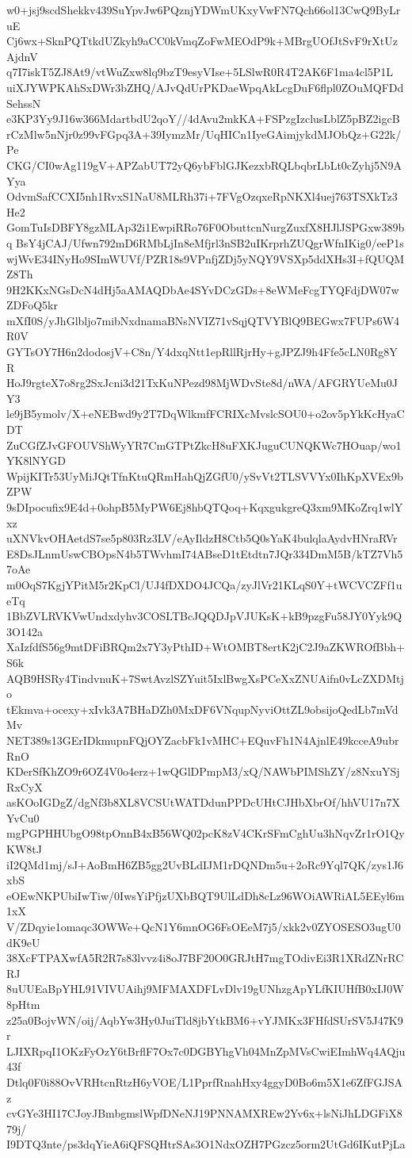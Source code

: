 w0+jsj9scdShekkv439SuYpvJw6PQznjYDWmUKxyVwFN7Qch66ol13CwQ9ByLruE
Cj6wx+SknPQTtkdUZkyh9aCC0kVmqZoFwMEOdP9k+MBrgUOfJtSvF9rXtUzAjdnV
q7I7iskT5ZJ8At9/vtWuZxw8lq9bzT9esyVIse+5LSlwR0R4T2AK6F1ma4cl5P1L
uiXJYWPKAhSxDWr3bZHQ/AJvQdUrPKDaeWpqAkLcgDuF6flpl0ZOuMQFDdSehssN
e3KP3Yy9J16w366MdartbdU2qoY//4dAvu2mkKA+FSPzgIzclusLblZ5pBZ2igcB
rCzMlw5nNjr0z99vFGpq3A+39IymzMr/UqHICn1IyeGAimjykdMJObQz+G22k/Pe
CKG/CI0wAg119gV+APZabUT72yQ6ybFblGJKezxbRQLbqbrLbLt0cZyhj5N9AYya
OdvmSafCCXI5nh1RvxS1NaU8MLRh37i+7FVgOzqxeRpNKXl4uej763TSXkTz3He2
GomTuIsDBFY8gzMLAp32i1EwpiRRo76F0ObuttcnNurgZuxfX8HJlJSPGxw389bq
BsY4jCAJ/Ufwn792mD6RMbLjIn8eMfjrl3nSB2uIKrprhZUQgrWfnIKig0/eeP1s
wjWvE34INyHo9SImWUVf/PZR18s9VPnfjZDj5yNQY9VSXp5ddXHs3I+fQUQMZ8Th
9H2KKxNGsDcN4dHj5aAMAQDbAe4SYvDCzGDs+8eWMeFcgTYQFdjDW07wZDFoQ5kr
mXfI0S/yJhGlbljo7mibNxdnamaBNsNVIZ71vSqjQTVYBlQ9BEGwx7FUPs6W4R0V
GYTsOY7H6n2dodosjV+C8n/Y4dxqNtt1epRllRjrHy+gJPZJ9h4Ffe5cLN0Rg8YR
HoJ9rgteX7o8rg2SxJcni3d21TxKuNPezd98MjWDvSte8d/nWA/AFGRYUeMu0JY3
le9jB5ymolv/X+eNEBwd9y2T7DqWlkmfFCRIXcMvslcSOU0+o2ov5pYkKcHyaCDT
ZuCGfZJvGFOUVShWyYR7CmGTPtZkcH8uFXKJuguCUNQKWc7HOuap/wo1YK8lNYGD
WpijKITr53UyMiJQtTfnKtuQRmHahQjZGfU0/ySvVt2TLSVVYx0IhKpXVEx9bZPW
9sDIpocufix9E4d+0ohpB5MyPW6Ej8hbQTQoq+KqxgukgreQ3xm9MKoZrq1wlYxz
uXNVkvOHAetdS7se5p803Rz3LV/eAyIldzH8Ctb5Q0sYaK4bulqlaAydvHNraRVr
E8DsJLnmUswCBOpsN4b5TWvhmI74ABseD1tEtdtn7JQr334DmM5B/kTZ7Vh57oAe
m0OqS7KgjYPitM5r2KpCl/UJ4fDXDO4JCQa/zyJlVr21KLqS0Y+tWCVCZFf1ueTq
1BbZVLRVKVwUndxdyhv3COSLTBcJQQDJpVJUKsK+kB9pzgFu58JY0Yyk9Q3O142a
XaIzfdfS56g9mtDFiBRQm2x7Y3yPthID+WtOMBT8ertK2jC2J9aZKWROfBbh+S6k
AQB9HSRy4TindvnuK+7SwtAvzlSZYuit5IxlBwgXsPCeXxZNUAifn0vLcZXDMtjo
tEkmva+ocexy+xIvk3A7BHaDZh0MxDF6VNqupNyviOttZL9obsijoQedLb7mVdMv
NET389s13GErIDkmupnFQjOYZacbFk1vMHC+EQuvFh1N4AjnlE49kcceA9ubrRnO
KDerSfKhZO9r6OZ4V0o4erz+1wQGlDPmpM3/xQ/NAWbPIMShZY/z8NxuYSjRxCyX
asKOoIGDgZ/dgNf3b8XL8VCSUtWATDdunPPDcUHtCJHbXbrOf/hhVU17n7XYvCu0
mgPGPHHUbgO98tpOnnB4xB56WQ02pcK8zV4CKrSFmCghUu3hNqvZr1rO1QyKW8tJ
iI2QMd1mj/sJ+AoBmH6ZB5gg2UvBLdIJM1rDQNDm5u+2oRc9Yql7QK/zys1J6xbS
eOEwNKPUbiIwTiw/0IwsYiPfjzUXbBQT9UlLdDh8cLz96WOiAWRiAL5EEyl6m1xX
V/ZDqyie1omaqc3OWWe+QcN1Y6mnOG6FsOEeM7j5/xkk2v0ZYOSESO3ugU0dK9eU
38XcFTPAXwfA5R2R7s83lvvz4i8oJ7BF20O0GRJtH7mgTOdivEi3R1XRdZNrRCRJ
8uUUEaBpYHL91VIVUAihj9MFMAXDFLvDlv19gUNhzgApYLfKIUHfB0xIJ0W8pHtm
z25a0BojvWN/oij/AqbYw3Hy0JuiTld8jbYtkBM6+vYJMKx3FHfdSUrSV5J47K9r
LJIXRpqI1OKzFyOzY6tBrflF7Ox7c0DGBYhgVh04MnZpMVsCwiEImhWq4AQju43f
Dtlq0F0i88OvVRHtcnRtzH6yVOE/L1PprfRnahHxy4ggyD0Bo6m5X1e6ZfFGJSAz
cvGYe3HI17CJoyJBmbgmslWpfDNeNJ19PNNAMXREw2Yv6x+lsNiJhLDGFiX879j/
I9DTQ3nte/ps3dqYieA6iQFSQHtrSAs3O1NdxOZH7PGzcz5orm2UtGd6IKutPjLa

